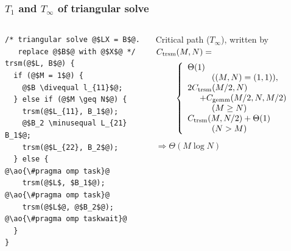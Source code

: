 \documentclass[12pt,dvipdfmx]{beamer}
\newcommand{\minusequal}{\mbox{\tt\ -= }}
\newcommand{\divequal}{\mbox{\tt\ /= }}
\newcommand{\ao}[1]{{\color{blue}#1}}
\begin{document}
\begin{frame}[fragile]
\frametitle{$T_1$ and $T_\infty$ of triangular solve}
\begin{columns}
\begin{column}{0.45\textwidth}
\begin{lstlisting}[basicstyle=\scriptsize]
/* triangular solve @$LX = B$@. 
   replace @$B$@ with @$X$@ */
trsm(@$L, B$@) {
  if (@$M = 1$@) {
    @$B \divequal l_{11}$@;
  } else if (@$M \geq N$@) {
    trsm(@$L_{11}, B_1$@);
    @$B_2 \minusequal L_{21} B_1$@;
    trsm(@$L_{22}, B_2$@);
  } else {
@\ao{\#pragma omp task}@
    trsm(@$L$, $B_1$@);
@\ao{\#pragma omp task}@
    trsm(@$L$@, @$B_2$@);
@\ao{\#pragma omp taskwait}@
  }
}
\end{lstlisting}
\end{column}

\begin{column}{0.55\textwidth}
Critical path ($T_\infty$), 
written by $C_{\mbox{\scriptsize trsm}}(M, N) = $
{\small
\[ 
\left\{
\begin{array}{l}
\Theta(1)                               
\\ \hspace{1cm}{((M, N) = (1,1)), } \\
2 C_{\mbox{\scriptsize trsm}}(M/2, N) \\
\hspace{0.5cm} + C_{\mbox{\scriptsize gemm}}(M/2, N, M/2)
\\ \hspace{1cm}(M \geq N) \\
C_{\mbox{\scriptsize trsm}}(M, N/2) + \Theta(1) 
\\ \hspace{1cm}(N > M) \\
\end{array}
\right.
\]}
$\Rightarrow \Theta(M \log N)$
\end{column}
\end{columns}
\end{frame}
\end{document}
